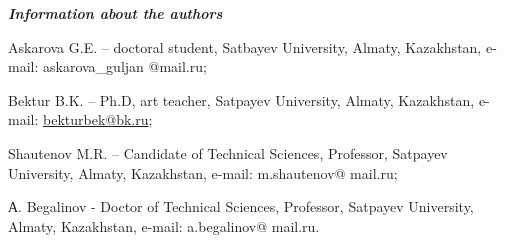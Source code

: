 \emph{{\bfseries Information about the authors}}

Askarova G.E. -- doctoral student, Satbayev University, Almaty,
Kazakhstan, e-mail: askarova\_guljan @mail.ru;

Bektur B.K. -- Ph.D, art teacher, Satpayev University, Almaty,
Kazakhstan, e-mail: \href{mailto:bekturbek@bk.run}{bekturbek@bk.ru};

Shautenov M.R. -- Candidate of Technical Sciences, Professor, Satpayev
University, Almaty, Kazakhstan, e-mail: m.shautenov@ mail.ru;

А. Begalinov - Doctor of Technical Sciences, Professor, Satpayev
University, Almaty, Kazakhstan, e-mail: a.begalinov@ mail.ru.